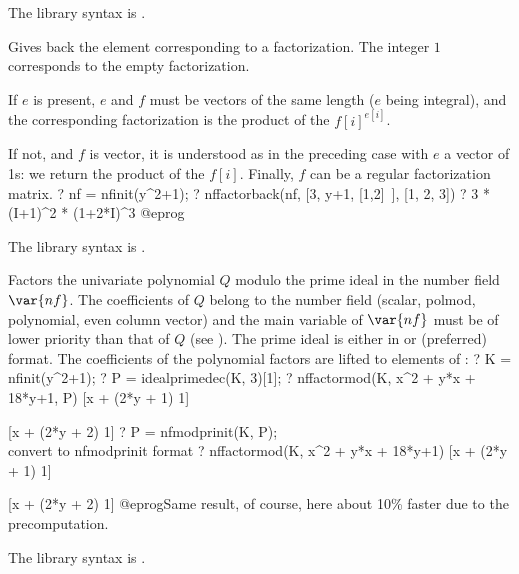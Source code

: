 The library syntax is .

\label{se:nffactorback}
Gives back the  element corresponding to a factorization.
The integer $1$ corresponds to the empty factorization.

If $e$ is present, $e$ and $f$ must be vectors of the same length ($e$ being
integral), and the corresponding factorization is the product of the
$f[i]^{e[i]}$.

If not, and $f$ is vector, it is understood as in the preceding case with $e$
a vector of 1s: we return the product of the $f[i]$. Finally, $f$ can be a
regular factorization matrix.
\bprog
? nf = nfinit(y^2+1);
? nffactorback(nf, [3, y+1, [1,2]~], [1, 2, 3])
? 3 * (I+1)^2 * (1+2*I)^3
@eprog

The library syntax is .

\label{se:nffactormod}
Factors the univariate polynomial $Q$ modulo the prime ideal  in
the number field $\var{nf}$. The coefficients of $Q$ belong to the number
field (scalar, polmod, polynomial, even column vector) and the main variable
of $\var{nf}$ must be of lower priority than that of $Q$ (see
). The prime ideal  is either in
 or (preferred)  format. The coefficients
of the polynomial factors are lifted to elements of :
\bprog
? K = nfinit(y^2+1);
? P = idealprimedec(K, 3)[1];
? nffactormod(K, x^2 + y*x + 18*y+1, P)
[x + (2*y + 1) 1]

[x + (2*y + 2) 1]
? P = nfmodprinit(K, P);  \\ convert to nfmodprinit format
? nffactormod(K, x^2 + y*x + 18*y+1)
[x + (2*y + 1) 1]

[x + (2*y + 2) 1]
@eprog\noindent Same result, of course, here about 10\% faster due to the
precomputation.

The library syntax is .


